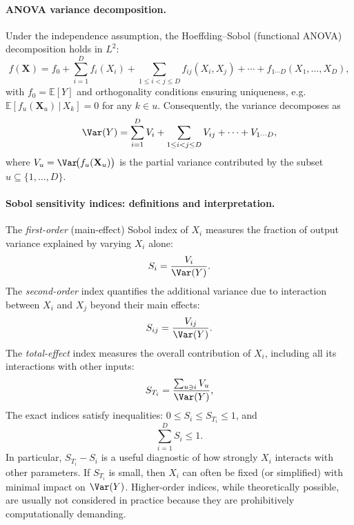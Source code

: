\paragraph{ANOVA variance decomposition.}
Under the independence assumption, the Hoeffding--Sobol (functional ANOVA) decomposition holds in $L^2$:
\begin{equation}
f(\mathbf{X}) = f_0 + \sum_{i=1}^D f_i(X_i) + \sum_{1\le i<j\le D} f_{ij}(X_i,X_j) + \cdots + f_{1\cdots D}(X_1,\dots,X_D),
\end{equation}
with $f_0=\mathbb{E}[Y]$ and orthogonality conditions ensuring uniqueness, e.g.
$\mathbb{E}[f_u(\mathbf{X}_u)\,|\,X_k]=0$ for any $k\in u$. Consequently, the variance decomposes as
\begin{equation}
\Var(Y) = \sum_{i=1}^D V_i + \sum_{1\le i<j\le D} V_{ij} + \cdots + V_{1\cdots D},
\end{equation}
where $V_u=\Var\!\big(f_u(\mathbf{X}_u)\big)$ is the partial variance contributed by the subset $u\subseteq\{1,\dots,D\}$.

\paragraph{Sobol sensitivity indices: definitions and interpretation.}
The \emph{first-order} (main-effect) Sobol index of $X_i$ measures the fraction of output variance explained by varying
$X_i$ alone:
\begin{equation}
S_i = \frac{V_i}{\Var(Y)}.
\end{equation}
The \emph{second-order} index quantifies the additional variance due to interaction between $X_i$ and $X_j$ beyond their main effects:
\begin{equation}
S_{ij} = \frac{V_{ij}}{\Var(Y)}.
\end{equation}
The \emph{total-effect} index measures the overall contribution of $X_i$, including all its interactions with other inputs:
\begin{equation}
S_{T_i} = \frac{\sum_{u\ni i} V_u}{\Var(Y)},
\end{equation}
The exact indices satisfy inequalities:
$0\le S_i\le S_{T_i}\le 1$, and
\begin{equation}
\sum_{i=1}^D S_i \le 1.
\end{equation}
In particular, $S_{T_i}-S_i$ is a useful diagnostic of how
strongly $X_i$ interacts with other parameters. If $S_{T_i}$ is small, then $X_i$ can often be fixed (or simplified) with minimal impact on $\Var(Y)$. Higher-order indices, while theoretically possible, are usually not considered in practice because they are prohibitively computationally demanding.

